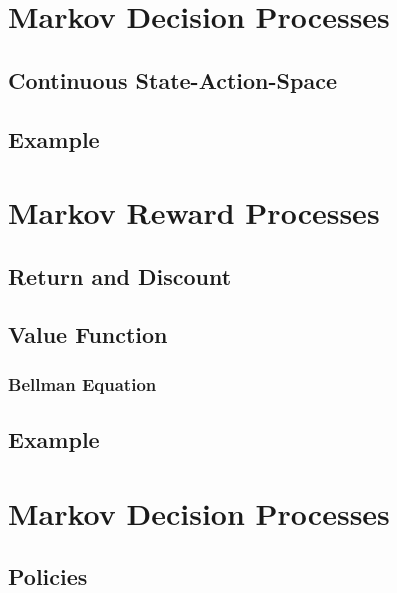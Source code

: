 	\section{Markov Decision Processes} %

		\subsection{Continuous State-Action-Space} %

		\subsection{Example} %

	\section{Markov Reward Processes} %

		\subsection{Return and Discount} %

		\subsection{Value Function} %

			\subsubsection{Bellman Equation} %

		\subsection{Example} %

	\section{Markov Decision Processes} %

		\subsection{Policies} %

